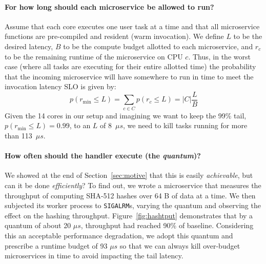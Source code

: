 \paragraph{For how long should each microservice be allowed to run?}
Assume that each core executes one user task at a time and that all microservice
functions are pre-compiled and resident (warm invocation).
We define $L$ to be the desired latency, $B$ to be the
compute budget allotted to each microservice, and $r_c$ to be the remaining runtime
of the microservice on CPU $c$.  Thus, in the worst case (where all tasks are
executing for their entire allotted time) the probability that the incoming
microservice will have somewhere to run in time to meet the invocation
latency SLO is given by:
\begin{equation}
p(r_\textrm{min} \le L) = \sum\limits_{c \in C} p(r_c \le L) = \big| C \big| \frac{L}{B}
\end{equation}
Given the 14 cores in our setup and imagining we want to keep the 99\% tail,
$p(r_\textrm{min} \le L) = 0.99$, to an $L$ of 8~$\mu{}s$, we need to kill tasks
running for more than 113~$\mu{}s$.

\paragraph{How often should the handler execute (the \emph{quantum})?}
We showed at the end of Section~\ref{sec:motive} that this is easily
\textit{achievable}, but can it be done \textit{efficiently}?  To find out, we wrote
a microservice that measures the throughput of computing SHA-512 hashes over 64 B of
data at a time.  We then subjected its worker process to \texttt{SIGALRM}s, varying
the quantum and observing the effect on the hashing throughput.
Figure~\ref{fig:hashtput} demonstrates that by a quantum of about 20 $\mu{}s$,
throughput had reached 90\% of baseline.  Considering this an acceptable performance
degradation, we adopt this quantum and prescribe a runtime budget of 93 $\mu{}s$ so
that we can always kill over-budget microservices in time to avoid impacting the tail
latency.

